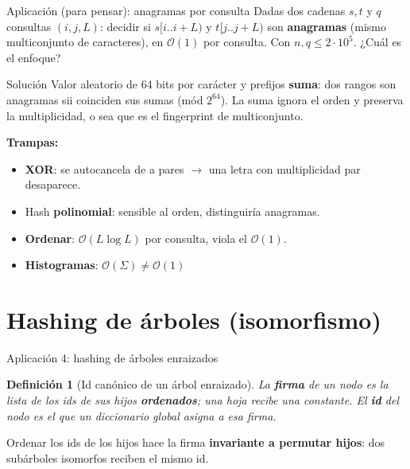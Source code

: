 \documentclass{beamer}
\newtheorem{definicion}{Definición}
\begin{document}
\begin{frame}{Aplicación (para pensar): anagramas por consulta}
Dadas dos cadenas $s, t$ y $q$ consultas $(i, j, L)$: decidir si $s[i..i{+}L)$ y $t[j..j{+}L)$ son \textbf{anagramas} (mismo multiconjunto de caracteres), en $\mathcal{O}(1)$ por consulta. Con $n, q \le 2\cdot 10^5$. ¿Cuál es el enfoque?
\pause
\begin{block}{Solución}
\footnotesize
Valor aleatorio de 64 bits por carácter y prefijos \textbf{suma}: dos rangos son anagramas sii coinciden sus sumas (mód $2^{64}$). La suma ignora el orden y preserva la multiplicidad, o sea que es el fingerprint de multiconjunto.

\textbf{Trampas:}
\begin{itemize}
    \item \textbf{XOR}: se autocancela de a pares $\to$ una letra con multiplicidad par desaparece.
    \item Hash \textbf{polinomial}: sensible al orden, distinguiría anagramas.
    \item \textbf{Ordenar}: $\mathcal{O}(L\log L)$ por consulta, viola el $\mathcal{O}(1)$.
    \item \textbf{Histogramas}: $\mathcal{O}(\Sigma) \neq \mathcal{O}(1)$
\end{itemize}
\end{block}
\end{frame}

\section{Hashing de árboles (isomorfismo)}

\begin{frame}{Aplicación 4: hashing de árboles enraizados}
\begin{definicion}[Id canónico de un árbol enraizado]
La \textbf{firma} de un nodo es la lista de los ids de sus hijos \textbf{ordenados}; una hoja recibe una constante. El \textbf{id} del nodo es el que un diccionario global asigna a esa firma.
\end{definicion}
Ordenar los ids de los hijos hace la firma \textbf{invariante a permutar hijos}: dos subárboles isomorfos reciben el mismo id.
\end{frame}
\end{document}
